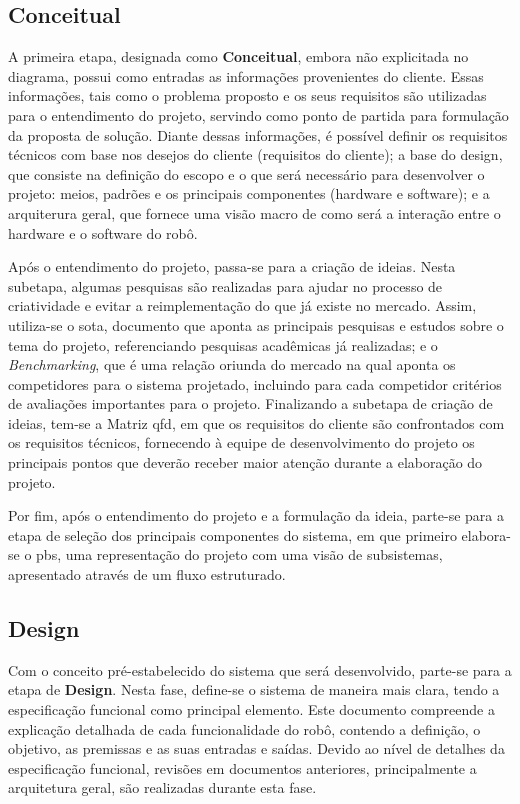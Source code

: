 \subsection{Conceitual}
\label{subsec:metodologia_conceitual}

A primeira etapa, designada como \textbf{Conceitual}, embora não explicitada no diagrama, possui como entradas as informações provenientes do cliente. Essas informações, tais como o problema proposto e os seus requisitos são utilizadas para o entendimento do projeto, servindo como ponto de partida para formulação da proposta de solução. Diante dessas informações, é possível definir os requisitos técnicos com base nos desejos do cliente (requisitos do cliente); a base do design, que consiste na definição do escopo e o que será necessário para desenvolver o projeto: meios, padrões e os principais componentes (hardware e software); e a arquiterura geral, que fornece uma visão macro de como será a interação entre o hardware e o software do robô. 

Após o entendimento do projeto, passa-se para a criação de ideias. Nesta subetapa, algumas pesquisas são realizadas para ajudar no processo de criatividade e evitar a reimplementação do que já existe no mercado. Assim, utiliza-se o \gls*{sota}, documento que aponta as principais pesquisas  e estudos sobre o tema do projeto, referenciando pesquisas acadêmicas já realizadas; e o \textit{Benchmarking}, que é uma relação oriunda do mercado na qual aponta os competidores para o sistema projetado, incluindo para cada competidor critérios de avaliações importantes para o projeto. Finalizando a subetapa de criação de ideias, tem-se a Matriz \gls*{qfd}, em que os requisitos do cliente são confrontados com os requisitos técnicos, fornecendo à equipe de desenvolvimento do projeto os principais pontos que deverão receber maior atenção durante a elaboração do projeto. 

Por fim, após o entendimento do projeto e a formulação da ideia, parte-se para a etapa de seleção dos principais componentes do  sistema, em que primeiro elabora-se o \gls*{pbs}, uma representação do projeto com uma visão de subsistemas, apresentado através de um fluxo estruturado.

\subsection{Design}
\label{subsec:metodologia_design}
Com o conceito pré-estabelecido do sistema que será desenvolvido, parte-se para a etapa de \textbf{Design}. Nesta fase, define-se o sistema de maneira mais clara, tendo a especificação funcional como principal elemento. Este documento compreende a explicação  detalhada de cada funcionalidade do robô, contendo a definição, o objetivo, as premissas e as suas entradas e saídas. Devido ao nível de detalhes da especificação funcional, revisões em documentos anteriores, principalmente a arquitetura geral, são realizadas durante esta fase. 

